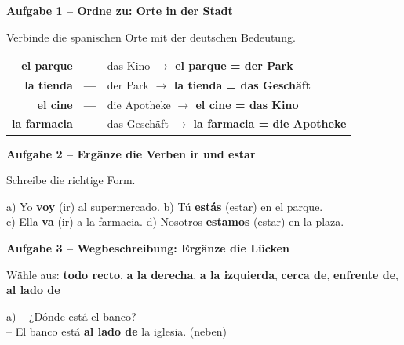 \documentclass[11pt, a4paper]{article}
\newcommand{\fachfarbe}{spanisch}
\newcommand{\punktebox}[1]{\hfill\fbox{\small \_/#1}}
\newcommand{\lsg}[1]{\textcolor{loesung}{\textbf{#1}}}
\newenvironment{aufgabe}[1]{%
    \needspace{5\baselineskip}%
    \nopagebreak[4]%
    \vspace{10pt}
    \noindent\textbf{\textcolor{\fachfarbe}{Aufgabe #1}}
    \nopagebreak[4]%
    \vspace{5pt}
    \nopagebreak[4]%
    \begin{list}{}{\leftmargin=0pt}
    \item[]
}{%
    \end{list}
}
\newcommand{\es}[1]{\textcolor{\fachfarbe}{\textbf{#1}}}
\begin{document}
\begin{aufgabe}{1 -- Ordne zu: Orte in der Stadt}
Verbinde die spanischen Orte mit der deutschen Bedeutung. \punktebox{4}
\end{aufgabe}

\begin{center}
\begin{tabular}{rcl}
\es{el parque} & \lsg{---} & das Kino \lsg{$\rightarrow$ el parque = der Park} \\[0.8em]
\es{la tienda} & \lsg{---} & der Park \lsg{$\rightarrow$ la tienda = das Geschäft} \\[0.8em]
\es{el cine} & \lsg{---} & die Apotheke \lsg{$\rightarrow$ el cine = das Kino} \\[0.8em]
\es{la farmacia} & \lsg{---} & das Geschäft \lsg{$\rightarrow$ la farmacia = die Apotheke} \\
\end{tabular}
\end{center}

\vspace{10pt}


\begin{aufgabe}{2 -- Ergänze die Verben ir und estar}
Schreibe die richtige Form. \punktebox{4}
\end{aufgabe}

\noindent
a) Yo \lsg{voy} (ir) al supermercado. \hfill
b) Tú \lsg{estás} (estar) en el parque. \\[0.8em]
c) Ella \lsg{va} (ir) a la farmacia. \hfill
d) Nosotros \lsg{estamos} (estar) en la plaza. \\

\vspace{10pt}


\begin{aufgabe}{3 -- Wegbeschreibung: Ergänze die Lücken}
Wähle aus: \es{todo recto}, \es{a la derecha}, \es{a la izquierda}, \es{cerca de}, \es{enfrente de}, \es{al lado de} \punktebox{6}
\end{aufgabe}

\noindent
a) -- ¿Dónde está el banco?\\
\hspace*{0.5cm} -- El banco está \lsg{al lado de} la iglesia. (neben)
\end{document}

